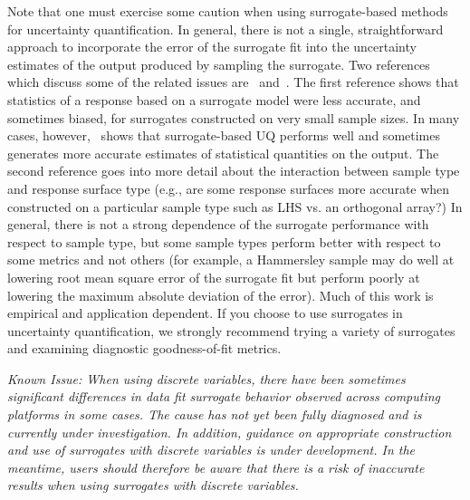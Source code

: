 Note that one must exercise some caution when using surrogate-based methods 
for uncertainty quantification. In general, there is not a single, 
straightforward approach to incorporate the error of the surrogate fit 
into the uncertainty estimates of the output produced by sampling the surrogate.
Two references which discuss some of the related 
issues are~\cite{Giu06} and~\cite{Swi06}. The first reference shows that 
statistics of a response based on a surrogate model were less accurate, and 
sometimes biased, for surrogates constructed on very small sample sizes. 
In many cases, however,~\cite{Giu06} shows that surrogate-based UQ performs 
well and sometimes generates more accurate estimates of statistical
quantities on the output. The second reference goes into more detail 
about the interaction between sample type and response surface type (e.g., 
are some response surfaces more accurate when constructed on a particular 
sample type such as LHS vs. an orthogonal array?) In general, there is not 
a strong dependence of the surrogate performance with respect to sample type, 
but some sample types perform better with respect to some metrics and not 
others (for example, a Hammersley sample may do well at lowering root mean 
square error of the surrogate fit but perform poorly at lowering the maximum 
absolute deviation of the error). Much of this work is empirical and 
application dependent. If you choose to use surrogates in uncertainty 
quantification, we strongly recommend trying a variety of surrogates 
and examining diagnostic goodness-of-fit metrics. 
  
\emph{Known Issue: When using discrete variables, there have been
  sometimes significant differences in data fit surrogate behavior
  observed across computing platforms in some cases.  The cause has
  not yet been fully diagnosed and is currently under investigation.
  In addition, guidance on appropriate construction and use of
  surrogates with discrete variables is under development.  In the
  meantime, users should therefore be aware that there is a risk of
  inaccurate results when using surrogates with discrete variables.}

